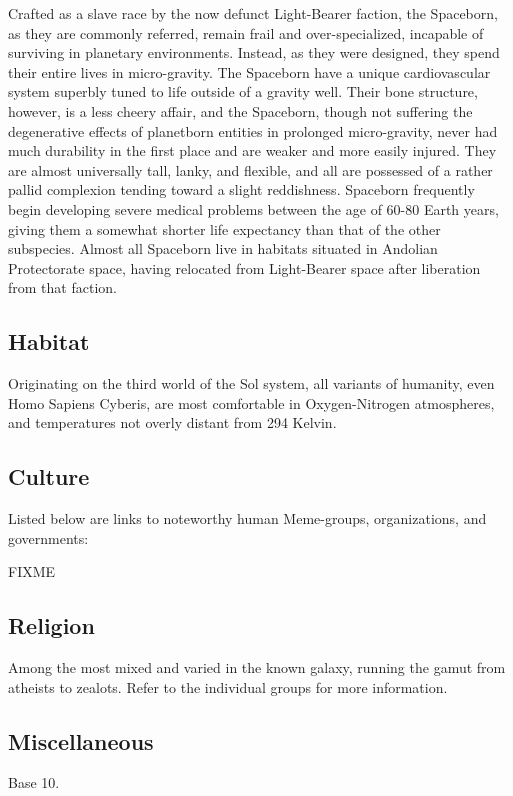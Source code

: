 \begin{itemize}
Crafted as a slave race by the now defunct Light-Bearer faction, the
Spaceborn, as they are commonly referred, remain frail and
over-specialized, incapable of surviving in planetary
environments. Instead, as they were designed, they spend their entire
lives in micro-gravity. The Spaceborn have a unique cardiovascular
system superbly tuned to life outside of a gravity well.  Their bone
structure, however, is a less cheery affair, and the Spaceborn, though
not suffering the degenerative effects of planetborn entities in
prolonged micro-gravity, never had much durability in the first place
and are weaker and more easily injured. They are almost universally
tall, lanky, and flexible, and all are possessed of a rather pallid
complexion tending toward a slight reddishness. Spaceborn frequently
begin developing severe medical problems between the age of 60-80
Earth years, giving them a somewhat shorter life expectancy than that
of the other subspecies.  Almost all Spaceborn live in habitats
situated in Andolian Protectorate space, having relocated from
Light-Bearer space after liberation from that faction.
\end{itemize}

\subsection{Habitat}

Originating on the third world of the Sol system, all variants of
humanity, even Homo Sapiens Cyberis, are most comfortable in
Oxygen-Nitrogen atmospheres, and temperatures not overly distant from
294 Kelvin.

\subsection{Culture}
Listed below are links to noteworthy human Meme-groups, organizations,
and governments:

FIXME 

\subsection{Religion}
Among the most mixed and varied in the known galaxy, running the gamut
from atheists to zealots. Refer to the individual groups for more
information.

\subsection{Miscellaneous}
Base 10. 


